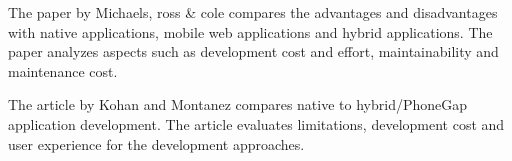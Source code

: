 The paper by Michaels, ross \& cole compares the advantages and disadvantages with native applications, mobile web applications and hybrid applications. The paper analyzes aspects such as development cost and effort, maintainability and maintenance cost. 

The article by Kohan and Montanez compares native to hybrid/PhoneGap application development.  The article evaluates  limitations, development cost and user experience for the development approaches.
